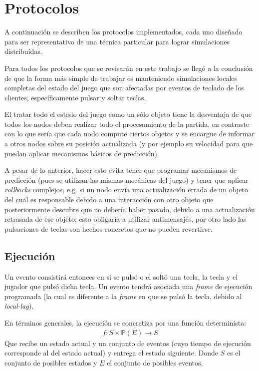 \section{Protocolos}



A continuación se describen los protocolos implementados, cada uno diseñado para ser representativo de una técnica particular para lograr simulaciones distribuídas.

Para todos los protocolos que se revisarán en este trabajo se llegó a la conclusión de que la forma más simple de trabajar es manteniendo simulaciones locales completas del estado del juego que son afectadas por eventos de teclado de los clientes, específicamente pulsar y soltar teclas.

El tratar todo el estado del juego como un sólo objeto tiene la desventaja de que todos los nodos deben realizar todo el procesamiento de la partida, en contraste con lo que sería que cada nodo compute ciertos objetos y se encargue de informar a otros nodos sobre su posición actualizada (y por ejemplo su velocidad para que puedan aplicar mecanismos básicos de predicción).

A pesar de lo anterior, hacer esto evita tener que programar mecanismos de predicción (pues se utilizan las mismas mecánicas del juego) y tener que aplicar \emph{rollbacks} complejos, e.g. si un nodo envía una actualización errada de un objeto del cual es responsable debido a una interacción con otro objeto que posteriormente descubre que no debería haber pasado, debido a una actualización retrasada de ese objeto; esto obligaría a utilizar antimensajes, por otro lado las pulsaciones de teclas son hechos concretos que no pueden revertirse.



\subsection{Ejecución}

Un evento consistirá entonces en si se pulsó o el soltó una tecla, la tecla y el jugador que pulsó dicha tecla. Un evento tendrá asociada una \emph{frame} de ejecución programada (la cual es diferente a la \emph{frame} en que se pulsó la tecla, debido al \emph{local-lag}).

En términos generales, la ejecución se concretiza por una función determinista:
\begin{align*}
    f : S \times \mathbb{P}(E) \rightarrow S
\end{align*}
Que recibe un estado actual y un conjunto de eventos (cuyo tiempo de ejecución corresponde al del estado actual) y entrega el estado siguiente. Donde $S$ es el conjunto de posibles estados y $E$ el conjunto de posibles eventos.


